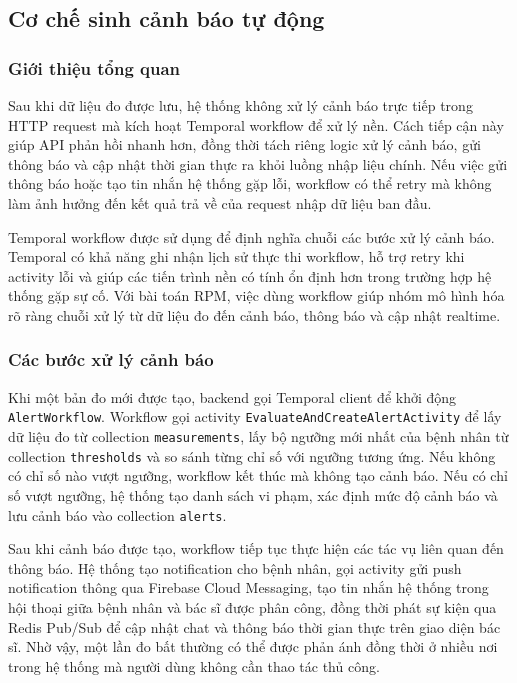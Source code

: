 \subsection{Cơ chế sinh cảnh báo tự động}

\subsubsection{Giới thiệu tổng quan}
\par Sau khi dữ liệu đo được lưu, hệ thống không xử lý cảnh báo trực tiếp trong HTTP request mà kích hoạt Temporal workflow để xử lý nền. Cách tiếp cận này giúp API phản hồi nhanh hơn, đồng thời tách riêng logic xử lý cảnh báo, gửi thông báo và cập nhật thời gian thực ra khỏi luồng nhập liệu chính. Nếu việc gửi thông báo hoặc tạo tin nhắn hệ thống gặp lỗi, workflow có thể retry mà không làm ảnh hưởng đến kết quả trả về của request nhập dữ liệu ban đầu.

\par Temporal workflow được sử dụng để định nghĩa chuỗi các bước xử lý cảnh báo. Temporal có khả năng ghi nhận lịch sử thực thi workflow, hỗ trợ retry khi activity lỗi và giúp các tiến trình nền có tính ổn định hơn trong trường hợp hệ thống gặp sự cố. Với bài toán RPM, việc dùng workflow giúp nhóm mô hình hóa rõ ràng chuỗi xử lý từ dữ liệu đo đến cảnh báo, thông báo và cập nhật realtime. \cite{temporaldocs}

\subsubsection{Các bước xử lý cảnh báo}
\par Khi một bản đo mới được tạo, backend gọi Temporal client để khởi động \texttt{AlertWorkflow}. Workflow gọi activity \texttt{EvaluateAndCreateAlertActivity} để lấy dữ liệu đo từ collection \texttt{measurements}, lấy bộ ngưỡng mới nhất của bệnh nhân từ collection \texttt{thresholds} và so sánh từng chỉ số với ngưỡng tương ứng. Nếu không có chỉ số nào vượt ngưỡng, workflow kết thúc mà không tạo cảnh báo. Nếu có chỉ số vượt ngưỡng, hệ thống tạo danh sách vi phạm, xác định mức độ cảnh báo và lưu cảnh báo vào collection \texttt{alerts}.

\par Sau khi cảnh báo được tạo, workflow tiếp tục thực hiện các tác vụ liên quan đến thông báo. Hệ thống tạo notification cho bệnh nhân, gọi activity gửi push notification thông qua Firebase Cloud Messaging, tạo tin nhắn hệ thống trong hội thoại giữa bệnh nhân và bác sĩ được phân công, đồng thời phát sự kiện qua Redis Pub/Sub để cập nhật chat và thông báo thời gian thực trên giao diện bác sĩ. Nhờ vậy, một lần đo bất thường có thể được phản ánh đồng thời ở nhiều nơi trong hệ thống mà người dùng không cần thao tác thủ công.


